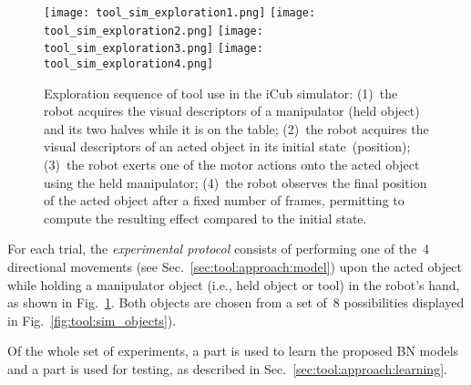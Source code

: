 \begin{figure}
\newcommand{\myheight}{2.5cm}
\centering
\subfloat
{\texttt{[image: tool\_sim\_exploration1.png]} \label{fig:tool:sim_exploration:1} } \quad
%
\subfloat
{\texttt{[image: tool\_sim\_exploration2.png]} \label{fig:tool:sim_exploration:2} } \quad
%
\subfloat
{\texttt{[image: tool\_sim\_exploration3.png]} \label{fig:tool:sim_exploration:3} } \quad
%
\subfloat
{\texttt{[image: tool\_sim\_exploration4.png]} \label{fig:tool:sim_exploration:4} } \quad
%
\caption[Exploration sequence of tool use in the iCub simulator.]{Exploration sequence of tool use in the iCub simulator: (1)~the robot acquires the visual descriptors of a manipulator (held object) and its two halves while it is on the table; (2)~the robot acquires the visual descriptors of an acted object in its initial state~(position); (3)~the robot exerts one of the motor actions onto the acted object using the held manipulator; (4)~the robot observes the final position of the acted object after a fixed number of frames, permitting to compute the resulting effect compared to the initial state.}
\label{fig:tool:sim_exploration}
\end{figure}

For each trial, the \emph{experimental protocol} consists of performing one of the~4 directional movements (see Sec.~\ref{sec:tool:approach:model}) upon the acted object while holding a manipulator object (i.e., held object or tool) in the robot's hand, as shown in Fig.~\ref{fig:tool:sim_exploration}.
Both objects are chosen from a set of~8 possibilities displayed in Fig.~\ref{fig:tool:sim_objects}).

Of the whole set of experiments, a part is used to learn the proposed \acl{BN} models and a part is used for testing, as described in Sec.~\ref{sec:tool:approach:learning}.

